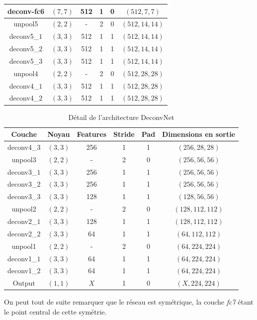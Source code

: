 \documentclass[a4paper, 11pt]{report}
\begin{document}
\begin{table}[H]
\begin{tabular}{|c|c|c|c|c|c|}
	\hline
	deconv-fc6 & $(7, 7)$ & 512 & 1 & 0 & $(512, 7, 7)$ \\
	\hline
	unpool5 & $(2, 2)$ & - & 2 & 0 & $(512, 14, 14)$ \\
	\hline	
	deconv5\_$1$ & $(3, 3)$ & 512 & 1 & 1 & $(512, 14, 14)$ \\
	\hline
	deconv5\_$2$ & $(3, 3)$ & 512 & 1 & 1 & $(512, 14, 14)$ \\
	\hline
	deconv5\_$3$ & $(3, 3)$ & 512 & 1 & 1 & $(512, 14, 14)$ \\
	\hline
	unpool4 & $(2, 2)$ & - & 2 & 0 & $(512, 28, 28)$ \\
	\hline
	deconv4\_$1$ & $(3, 3)$ & 512 & 1 & 1 & $(512, 28, 28)$ \\
	\hline
	deconv4\_$2$ & $(3, 3)$ & 512 & 1 & 1 & $(512, 28, 28)$ \\
	\hline
	
	\end{tabular} 
\end{table}
\begin{table}[H]
	\centering
	\begin{tabular}{|c|c|c|c|c|c|}
	\hline 
	Couche & Noyau & Features & Stride & Pad & Dimensions en sortie \\ 
	\hline
	
	deconv4\_$3$ & $(3, 3)$ & 256 & 1 & 1 & $(256, 28, 28)$ \\
	\hline
	unpool3 & $(2, 2)$ & - & 2 & 0 & $(256, 56, 56)$ \\
	\hline
	deconv3\_$1$ & $(3, 3)$ & 256 & 1 & 1 & $(256, 56, 56)$ \\
	\hline
	deconv3\_$2$ & $(3, 3)$ & 256 & 1 & 1 & $(256, 56, 56)$ \\
	\hline
	deconv3\_$3$ & $(3, 3)$ & 128 & 1 & 1 & $(128, 56, 56)$ \\
	\hline
	unpool2 & $(2, 2)$ & - & 2 & 0 & $(128, 112, 112)$ \\
	\hline
	deconv2\_$1$ & $(3, 3)$ & 128 & 1 & 1 & $(128, 112, 112)$ \\
	\hline
	deconv2\_$2$ & $(3, 3)$ & 64 & 1 & 1 & $(64, 112, 112)$ \\
	\hline
	unpool1 & $(2, 2)$ & - & 2 & 0 & $(64, 224, 224)$ \\
	\hline
	deconv1\_$1$ & $(3, 3)$ & 64 & 1 & 1 & $(64, 224, 224)$ \\
	\hline
	deconv1\_$2$ & $(3, 3)$ & 64 & 1 & 1 & $(64, 224, 224)$ \\
	\hline
	Output & $(1, 1)$ & $X$ & 1 & 0 & $(X, 224, 224)$ \\
	\hline
	\end{tabular} 
	\caption{Détail de l'architecture DeconvNet}
\end{table}
On peut tout de suite remarquer que le réseau est symétrique, la couche \emph{fc7} étant le point central de cette symétrie.
\end{document}
